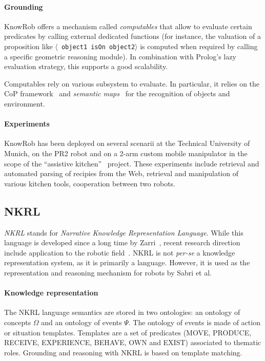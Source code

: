 \documentclass{IEEEtran}
\newcommand{\stmt}[1]{{\footnotesize \tt $\langle$ #1\relax$\rangle$}}
\begin{document}
\paragraph{Grounding} {\sc KnowRob} offers a mechanism called \emph{computables} that allow to
evaluate certain predicates by calling external dedicated functions (for
instance, the valuation of a proposition like \stmt{object1 isOn object2} is
computed when required by calling a specific geometric reasoning module). In
combination with Prolog's lazy evaluation strategy, this supports a good
scalability.

Computables rely on various subsystem to evaluate. In particular, it relies on
the CoP framework~\cite{Klank2009} and \emph{semantic maps}~\cite{Blodow2011}
for the recognition of objects and environment.


\paragraph{Experiments} {\sc KnowRob} has been deployed on several scenarii at
the Technical University of Munich, on the PR2 robot and on a 2-arm custom
mobile manipulator in the scope of the ``assistive kitchen''~\cite{Beetz2008}
project. These experiments include retrieval and automated parsing of recipies
from the Web, retrieval and manipulation of various kitchen tools, cooperation
between two robots.

\subsection{NKRL}
\label{sect|nkrl}

\emph{NKRL} stands for \emph{Narrative Knowledge Representation Language}.
While this language is developed since a long time by Zarri~\cite{Zarri1997,
Zarri2008}, recent research direction include application to the robotic
field~\cite{Sabri2011}. NKRL is not {\it per-se} a knowledge representation
system, as it is primarily a language. However, it is used as the
representation and reasoning mechanism for robots by Sabri et al.

\paragraph{Knowledge representation} The NKRL language semantics are stored in
two ontologies: an ontology of concepts $\Omega$ and an ontology of events
$\Psi$. The ontology of events is made of action or situation templates.
Templates are a set of predicates (MOVE, PRODUCE, RECEIVE, EXPERIENCE, BEHAVE,
OWN and EXIST) associated to thematic roles. Grounding and reasoning with NKRL
is based on template matching.
\end{document}
